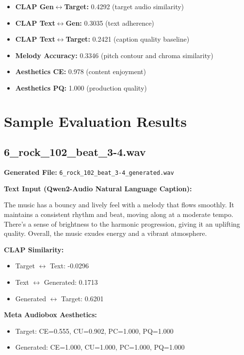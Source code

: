 \documentclass{article}
\begin{document}
\begin{CJK}{UTF8}{bsmi}
\begin{itemize}
    \item \textbf{CLAP Gen$\leftrightarrow$Target:} 0.4292 (target audio similarity)
    \item \textbf{CLAP Text$\leftrightarrow$Gen:} 0.3035 (text adherence)
    \item \textbf{CLAP Text$\leftrightarrow$Target:} 0.2421 (caption quality baseline)
    \item \textbf{Melody Accuracy:} 0.3346 (pitch contour and chroma similarity)
    \item \textbf{Aesthetics CE:} 0.978 (content enjoyment)
    \item \textbf{Aesthetics PQ:} 1.000 (production quality)
\end{itemize}

\section{Sample Evaluation Results}

\subsection{6\_rock\_102\_beat\_3-4.wav}

\textbf{Generated File:} \texttt{6\_rock\_102\_beat\_3-4\_generated.wav}

\textbf{Text Input (Qwen2-Audio Natural Language Caption):}

\small
The music has a bouncy and lively feel with a melody that flows smoothly. It maintains a consistent rhythm and beat, moving along at a moderate tempo. There's a sense of brightness to the harmonic progression, giving it an uplifting quality. Overall, the music exudes energy and a vibrant atmosphere.
\normalsize

\textbf{CLAP Similarity:}
\begin{itemize}
    \item Target $\leftrightarrow$ Text: -0.0296
    \item Text $\leftrightarrow$ Generated: 0.1713
    \item Generated $\leftrightarrow$ Target: 0.6201
\end{itemize}

\textbf{Meta Audiobox Aesthetics:}
\begin{itemize}
    \item Target: CE=0.555, CU=0.902, PC=1.000, PQ=1.000
    \item Generated: CE=1.000, CU=1.000, PC=1.000, PQ=1.000
\end{itemize}


\end{CJK}
\end{document}

